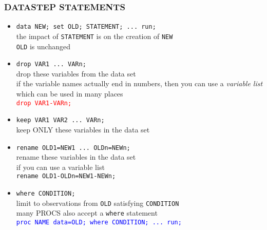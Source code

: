 \documentclass[11pt,pdftex,dvipsnames,usenames,helvetica]{beamer}
\begin{document}
\begin{frame}[fragile]
\frametitle{DATASTEP STATEMENTS}
\begin{itemize}
\item {\tt data NEW; set OLD; STATEMENT; ... run;}\\
the impact of {\tt STATEMENT} is on the creation of {\tt NEW}\\
 {\tt OLD} is unchanged
\item {\tt drop VAR1 ... VARn;}\\
  drop these variables from the data set\\
  if the variable names actually end in numbers, then you can use a
  {\it variable list}
  which can be used in many places\\
  \textcolor{red}{\tt drop VAR1-VARn;}
\item {\tt keep VAR1 VAR2 ... VARn;}\\ 
keep ONLY these variables in the data set
\item {\tt rename OLD1=NEW1 ... OLDn=NEWn;}\\
rename these variables in the data set\\
if you can use a variable list\\
{\tt rename OLD1-OLDn=NEW1-NEWn;}
\item {\tt where CONDITION;}\\
limit to observations from {\tt OLD} satisfying {\tt CONDITION}\\
many PROCS also accept a {\tt where} statement\\
\textcolor{blue}{\tt proc NAME data=OLD; where CONDITION; ...\ run;}
\end{itemize}
\end{frame}
\end{document}
